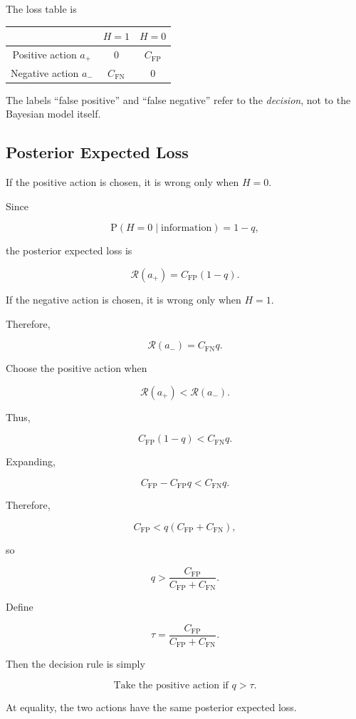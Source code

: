 \documentclass[11pt]{article}
\newcommand{\CFP}{C_{\mathrm{FP}}}
\newcommand{\CFN}{C_{\mathrm{FN}}}
\newcommand{\Risk}{\mathcal{R}}
\newcommand{\Prob}{\mathrm{P}}
\begin{document}
The loss table is

\begin{center}
\begin{tabular}{c|cc}
\toprule
 & $H=1$ & $H=0$ \\
\midrule
Positive action $a_+$ & $0$ & $\CFP$ \\
Negative action $a_-$ & $\CFN$ & $0$ \\
\bottomrule
\end{tabular}
\end{center}

The labels ``false positive'' and ``false negative'' refer to the \emph{decision}, not to the Bayesian model itself.

\subsection{Posterior Expected Loss}

If the positive action is chosen, it is wrong only when $H=0$.

Since

\[
\Prob(H=0\mid\text{information})=1-q,
\]

the posterior expected loss is

\[
\Risk(a_+)
=
\CFP(1-q).
\]

If the negative action is chosen, it is wrong only when $H=1$.

Therefore,

\[
\Risk(a_-)
=
\CFN q.
\]

Choose the positive action when

\[
\Risk(a_+)<\Risk(a_-).
\]

Thus,

\[
\CFP(1-q)<\CFN q.
\]

Expanding,

\[
\CFP-\CFP q<\CFN q.
\]

Therefore,

\[
\CFP<q(\CFP+\CFN),
\]

so

\[
\boxed{
q>
\frac{\CFP}{\CFP+\CFN}.
}
\]

Define

\[
\boxed{
\tau
=
\frac{\CFP}{\CFP+\CFN}.
}
\]

Then the decision rule is simply

\[
\boxed{
\text{Take the positive action if } q>\tau.
}
\]

At equality, the two actions have the same posterior expected loss.
\end{document}
